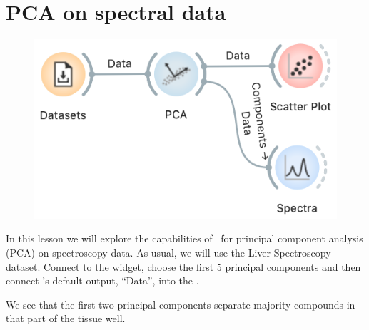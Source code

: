 \chapter{PCA on spectral data}
\label{ch:spectral-PCA}

\begin{figure}
    \includegraphics[scale=0.4]{workflow1.png}
\end{figure}

In this lesson we will explore the capabilities of \mutation\ for principal component analysis (PCA) on spectroscopy data. As usual, we will use the Liver Spectroscopy dataset. Connect  to the  widget, choose the first 5 principal components and then connect 's default output, ``Data'', into the .

We see that the first two principal components separate majority compounds in that part of the tissue well.

